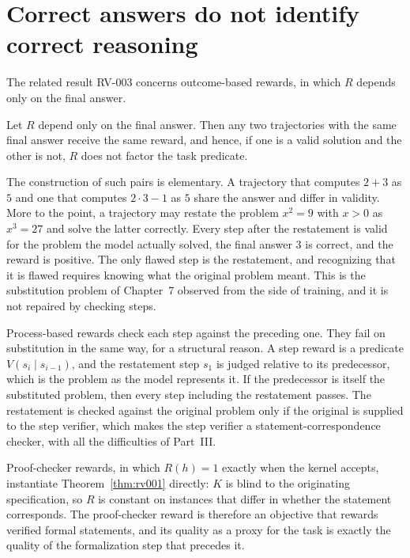 \section{Correct answers do not identify correct reasoning}

The related result RV-003 concerns outcome-based rewards, in which $R$ depends only on the final answer.

\begin{proposition}[RV-003]
\label{prop:rv003}
Let $R$ depend only on the final answer. Then any two trajectories with the same final answer receive the same reward, and hence, if one is a valid solution and the other is not, $R$ does not factor the task predicate.
\end{proposition}

The construction of such pairs is elementary. A trajectory that computes $2 + 3$ as $5$ and one that computes $2 \cdot 3 - 1$ as $5$ share the answer and differ in validity. More to the point, a trajectory may restate the problem $x^2 = 9$ with $x > 0$ as $x^3 = 27$ and solve the latter correctly. Every step after the restatement is valid for the problem the model actually solved, the final answer $3$ is correct, and the reward is positive. The only flawed step is the restatement, and recognizing that it is flawed requires knowing what the original problem meant. This is the substitution problem of Chapter~7 observed from the side of training, and it is not repaired by checking steps.

Process-based rewards check each step against the preceding one. They fail on substitution in the same way, for a structural reason. A step reward is a predicate $V(s_i \mid s_{i-1})$, and the restatement step $s_1$ is judged relative to its predecessor, which is the problem as the model represents it. If the predecessor is itself the substituted problem, then every step including the restatement passes. The restatement is checked against the original problem only if the original is supplied to the step verifier, which makes the step verifier a statement-correspondence checker, with all the difficulties of Part~III.

Proof-checker rewards, in which $R(h) = 1$ exactly when the kernel accepts, instantiate Theorem~\ref{thm:rv001} directly: $K$ is blind to the originating specification, so $R$ is constant on instances that differ in whether the statement corresponds. The proof-checker reward is therefore an objective that rewards verified formal statements, and its quality as a proxy for the task is exactly the quality of the formalization step that precedes it.

